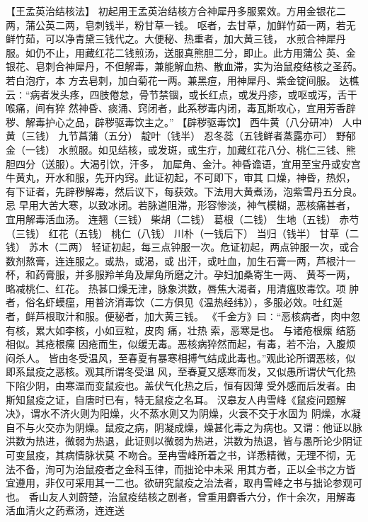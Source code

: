 \documentclass[a4paper,12pt,UTF8,twoside]{ctexbook}
\begin{document}
【王孟英治结核法】 
初起用王孟英治结核方合神犀丹多服累效。方用金银花二两，蒲公英二两，皂刺钱半，粉甘草一钱。 
呕者，去甘草，加鲜竹茹一两，若无鲜竹茹，可以净青黛三钱代之。大便秘、热重者，加大黄三钱， 
水煎合神犀丹服。如仍不止，用藏红花二钱煎汤，送服真熊胆二分，即止。此方用蒲公 
英、金银花、皂刺合神犀丹，不但解毒，兼能解血热、散血滞，实为治鼠疫结核之圣药。若白泡疔，本 
方去皂刺，加白菊花一两。兼黑痘，用神犀丹、紫金锭间服。 
达樵云∶“病者发头疼，四肢倦怠，骨节禁锢，或长红点，或发丹疹，或呕或泻，舌干喉痛，间有猝 
然神昏、痰涌、窍闭者，此系秽毒内闭，毒瓦斯攻心，宜用芳香辟秽、解毒护心之品，辟秽驱毒饮主之。” 
【辟秽驱毒饮】 
西牛黄（八分研冲） 人中黄（三钱） 九节菖蒲（五分） 靛叶（钱半） 
忍冬蕊（五钱鲜者蒸露亦可） 野郁金（一钱） 
水煎服。如见结核，或发斑，或生疔，加藏红花八分、桃仁三钱、熊胆四分（送服）。大渴引饮，汗多， 
加犀角、金汁。神昏谵语，宜用至宝丹或安宫牛黄丸，开水和服，先开内窍。此证初起，不可即下，审其 
口燥，神昏，热炽，有下证者，先辟秽解毒，然后议下，每获效。下法用大黄煮汤，泡紫雪丹五分良。忌 
早用大苦大寒，以致冰闭。若脉道阻滞，形容惨淡，神气模糊，恶核痛甚者，宜用解毒活血汤。 
连翘（三钱） 柴胡（二钱） 葛根（二钱） 生地（五钱） 
赤芍（三钱） 红花（五钱） 桃仁（八钱） 川朴（一钱后下） 
当归（钱半） 甘草（二钱） 苏木（二两） 
轻证初起，每三点钟服一次。危证初起，两点钟服一次，或合数剂熬膏，连连服之。或热，或渴，或 
出汗，或吐血，加生石膏一两，芦根汁一杯，和药膏服，并多服羚羊角及犀角所磨之汁。孕妇加桑寄生一两、 
黄芩一两，略减桃仁、红花。 
热甚口燥无津，脉象洪数，唇焦大渴者，用清瘟败毒饮。项 
肿者，俗名虾蟆瘟，用普济消毒饮（二方俱见《温热经纬》），多服必效。吐红涎 
者，鲜芦根取汁和服。便秘者，加大黄三钱。 
《千金方》曰∶“恶核病者，肉中忽有核，累大如李核，小如豆粒，皮肉 痛，壮热 索，恶寒是也。 
与诸疮根瘰 结筋相似。其疮根瘰 因疮而生，似缓无毒。恶核病猝然而起，有毒，若不治，入腹烦闷杀人。 
皆由冬受温风，至春夏有暴寒相搏气结成此毒也。”观此论所谓恶核，似即系鼠疫之恶核。观其所谓冬受温 
风，至春夏又感寒而发，又似愚所谓伏气化热下陷少阴，由寒温而变鼠疫也。盖伏气化热之后，恒有因薄 
受外感而后发者。由斯知鼠疫之证，自唐时已有，特无鼠疫之名耳。 
汉皋友人冉雪峰《鼠疫问题解决》，谓水不济火则为阳燥，火不蒸水则又为阴燥，火衰不交于水固为 
阴燥，水凝自不与火交亦为阴燥。鼠疫之病，阴凝成燥，燥甚化毒之为病也。又谓∶他证以脉 
洪数为热进，微弱为热退，此证则以微弱为热进，洪数为热退，皆与愚所论少阴证可变鼠疫，其病情脉状莫 
不吻合。至冉雪峰所着之书，详悉精微，无理不彻，无法不备，洵可为治鼠疫者之金科玉律，而拙论中未采 
用其方者，正以全书之方皆宜遵用，非仅可采用其一二也。欲研究鼠疫之治法者，取冉雪峰之书与拙论参观可也。 
香山友人刘蔚楚，治鼠疫结核之剧者，曾重用麝香六分，作十余次，用解毒活血清火之药煮汤，连连送 
\end{document}
